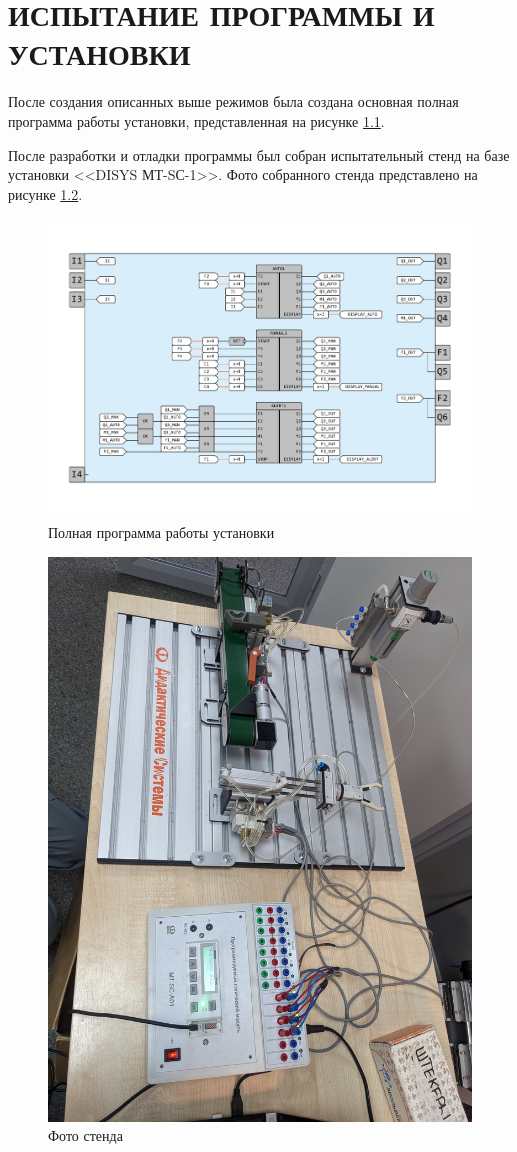 \chapter{ИСПЫТАНИЕ ПРОГРАММЫ И УСТАНОВКИ}
После создания описанных выше режимов была создана основная полная программа работы установки, представленная на рисунке \ref{fig:program}.

После разработки и отладки программы был собран испытательный стенд на базе установки <<DISYS МТ-SС-1>>. Фото собранного стенда представлено на рисунке \ref{fig:stand}.
\begin{figure}[h]
    \centering
    \includegraphics[width=1\textwidth]{fig/main.pdf}
    \caption{Полная программа работы установки}
    \label{fig:program}
\end{figure}
\begin{figure}[h]
    \centering
    \includegraphics[width=1\textwidth]{fig/stand.jpg}
    \caption{Фото стенда}
    \label{fig:stand}
\end{figure}
